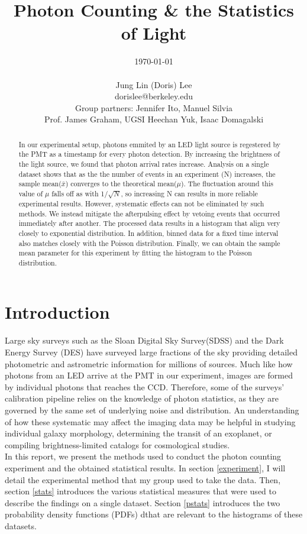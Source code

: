 \documentclass[authoryear, 12pt,5p, times]{elsarticle}
\begin{document}
\begin{frontmatter}
\title{Photon Counting \& the Statistics of Light}
\author{\today \\ \quad \\Jung Lin (Doris) Lee\\ dorislee@berkeley.edu\\Group partners: Jennifer Ito, Manuel Silvia\\Prof. James Graham, UGSI Heechan Yuk, Isaac Domagalski}
	\begin{abstract}
	  In our experimental setup, photons emmited by an LED light source is regestered by the PMT as a timestamp for every photon detection. By increasing the brightness of the light source, we found that photon arrival rates increase. Analysis on a single dataset shows that as the the number of events in an experiment (N) increases, the sample mean($\bar{x}$) converges to the theoretical mean($\mu$).  The fluctuation around this value of $\mu$ falls off as with 1/$\sqrt{N}$, so increasing N can results in more reliable experimental results. However, systematic effects can not be eliminated by such methods. We instead mitigate the afterpulsing effect by vetoing events that occurred immediately after another. The processed data results in a histogram that align very closely to exponential distribution. In addition, binned data for a fixed time interval also matches closely with the Poisson distribution. Finally, we can obtain the sample mean parameter for this  experiment by fitting the histogram to the Poisson distribution.  
	\end{abstract}
\end{frontmatter}
\section{Introduction\label{intro}}
\indent Large sky surveys such as the Sloan Digital Sky Survey(SDSS) and the Dark Energy Survey (DES) have surveyed large fractions of the sky providing detailed photometric and astrometric information for millions of sources. Much like how photons from an LED arrive at the PMT in our experiment, images are formed by individual photons that reaches the CCD.  Therefore, some of the surveys' calibration pipeline relies on the knowledge of photon statistics, as  they are governed by the same set of underlying noise and distribution. An understanding of how these systematic may affect the imaging data may be helpful in studying individual galaxy morphology, determining the transit of an exoplanet, or compiling brightness-limited catalogs for cosmological studies.  
 \\
\indent In this report, we present the methods used to conduct the photon counting experiment and the obtained statistical results. In section \ref{experiment}, I will detail the experimental method that my group used to take the data. Then, section \ref{stats} introduces the various statistical measures that were used to describe the findings on a single dataset. Section \ref{pstats} introduces the two probability density functions (PDFs) dthat are relevant to the histograms of these datasets.
\end{document}
